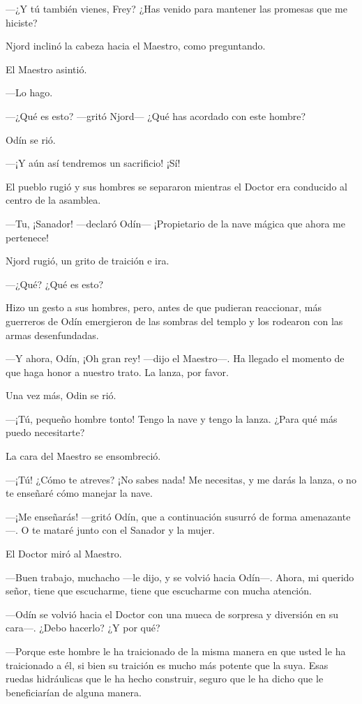 ---¿Y tú también vienes, Frey? ¿Has venido para mantener las promesas
que me hiciste?

Njord inclinó la cabeza hacia el Maestro, como preguntando.

El Maestro asintió.

---Lo hago.

---¿Qué es esto? ---gritó Njord--- ¿Qué has acordado con este hombre?

Odín se rió.

---¡Y aún así tendremos un sacrificio! ¡Sí!

El pueblo rugió y sus hombres se separaron mientras el Doctor era
conducido al centro de la asamblea.

---Tu, ¡Sanador! ---declaró Odín--- ¡Propietario de la nave mágica que
ahora me pertenece!

Njord rugió, un grito de traición e ira.

---¿Qué? ¿Qué es esto?

Hizo un gesto a sus hombres, pero, antes de que pudieran reaccionar, más
guerreros de Odín emergieron de las sombras del templo y los rodearon
con las armas desenfundadas.

---Y ahora, Odín, ¡Oh gran rey! ---dijo el Maestro---. Ha llegado el
momento de que haga honor a nuestro trato. La lanza, por favor.

Una vez más, Odin se rió.

---¡Tú, pequeño hombre tonto! Tengo la nave y tengo la lanza. ¿Para qué
más puedo necesitarte?

La cara del Maestro se ensombreció.

---¡Tú! ¿Cómo te atreves? ¡No sabes nada! Me necesitas, y me darás la
lanza, o no te enseñaré cómo manejar la nave.

---¡Me enseñarás! ---gritó Odín, que a continuación susurró de forma
amenazante---. O te mataré junto con el Sanador y la mujer.

El Doctor miró al Maestro.

---Buen trabajo, muchacho ---le dijo, y se volvió hacia Odín---. Ahora,
mi querido señor, tiene que escucharme, tiene que escucharme con mucha
atención.

---Odín se volvió hacia el Doctor con una mueca de sorpresa y diversión
en su cara---. ¿Debo hacerlo? ¿Y por qué?

---Porque este hombre le ha traicionado de la misma manera en que usted
le ha traicionado a él, si bien su traición es mucho más potente que la
suya. Esas ruedas hidráulicas que le ha hecho construir, seguro que le
ha dicho que le beneficiarían de alguna manera.


